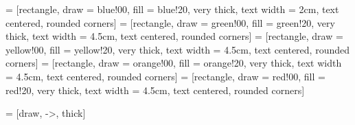 \usetikzlibrary{shapes, arrows}

 = [rectangle, draw = blue!00, fill = blue!20, very thick, text width = 2cm, text centered, rounded corners]
 = [rectangle, draw = green!00, fill = green!20, very thick, text width = 4.5cm, text centered, rounded corners]
 = [rectangle, draw = yellow!00, fill = yellow!20, very thick, text width = 4.5cm, text centered, rounded corners]
 = [rectangle, draw = orange!00, fill = orange!20, very thick, text width = 4.5cm, text centered, rounded corners]
 = [rectangle, draw = red!00, fill = red!20, very thick, text width = 4.5cm, text centered, rounded corners]

 = [draw, ->, thick]

\def\contra{
    \tikz[baseline, x = 0.22em, y=0.22em, line width = 0.032em]
    \draw (0,2.83)--(2.83,0) (0.71,3.54)--(3.54,0.71) (0,0.71)--(2.83,3.54) (0.71,0)--(3.54,2.83);
}